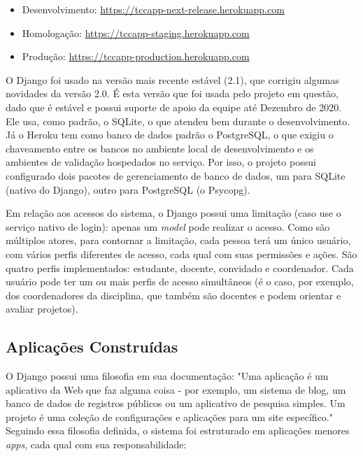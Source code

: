 \begin{itemize}
    \item Desenvolvimento: \href{https://tccapp-next-release.herokuapp.com}{https://tccapp-next-release.herokuapp.com}
    \item Homologação: \href{https://tccapp-staging.herokuapp.com}{https://tccapp-staging.herokuapp.com}
    \item Produção: \href{https://tccapp-production.herokuapp.com}{https://tccapp-production.herokuapp.com}
\end{itemize}

O Django foi usado na versão mais recente estável (2.1), que corrigiu algumas novidades da versão 2.0. É esta versão que foi usada pelo projeto em questão, dado que é estável e possui suporte de apoio da equipe até Dezembro de 2020\cite{djangodownload}. Ele usa, como padrão, o SQLite, o que atendeu bem durante o desenvolvimento. Já o Heroku tem como banco de dados padrão o PostgreSQL, o que exigiu o chaveamento entre os bancos no ambiente local de desenvolvimento e os ambientes de validação hospedados no serviço. Por isso, o projeto possui configurado dois pacotes de gerenciamento de banco de dados, um para SQLite (nativo do Django), outro para PostgreSQL (o Psycopg\cite{lucassouto2017}).

Em relação aos acessos do sistema, o Django possui uma limitação (caso use o serviço nativo de login): apenas um \textit{model} pode realizar o acesso. Como são múltiplos atores, para contornar a limitação, cada pessoa terá um único usuário, com vários perfis diferentes de acesso, cada qual com suas permissões e ações. São quatro perfis implementados: estudante, docente, convidado e coordenador. Cada usuário pode ter um ou mais perfis de acesso simultâneos (é o caso, por exemplo, dos coordenadores da disciplina, que também são docentes e podem orientar e avaliar projetos).

\subsection{Aplicações Construídas}
O Django possui uma filosofia em sua documentação\cite{djangodocs}: "Uma aplicação é um aplicativo da Web que faz alguma coisa - por exemplo, um sistema de blog, um banco de dados de registros públicos ou um aplicativo de pesquisa simples. Um projeto é uma coleção de configurações e aplicações para um site específico." Seguindo essa filosofia definida, o sistema foi estruturado em aplicações menores \textit{apps}, cada qual com sua responsabilidade:

